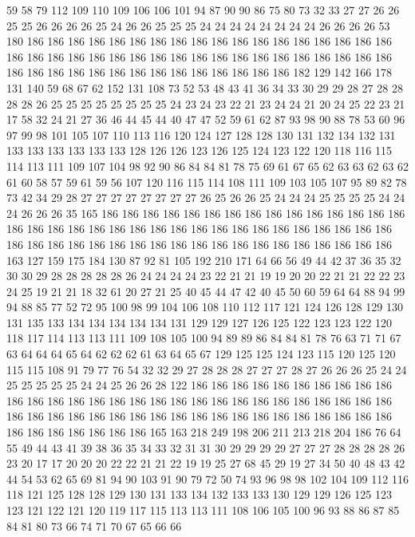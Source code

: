 59 58 79 112 109 110 109 106 106 101 94 87 90 90 86 75 80 73 32 33
27 27 26 26 25 25 26 26 26 26 25 24 26 26 25 25 25 24 24 24
24 24 24 24 24 26 26 26 26 53 180 186 186 186 186 186 186 186 186 186
186 186 186 186 186 186 186 186 186 186 186 186 186 186 186 186 186 186 186 186
186 186 186 186 186 186 186 186 186 186 186 186 186 186 186 186 186 186 186 186
186 186 182 129 142 166 178 131 140 59 68 67 62 152 131 108 73 52 53 48
43 41 36 34 33 30 29 29 28 27 28 28 28 28 26 25 25 25 25 25
25 25 25 24 23 24 23 22 21 23 24 24 21 20 24 25 22 23 21 17
58 32 24 21 27 36 46 44 45 44 40 47 47 52 59 61 62 87 93 98
90 88 78 53 60 96 97 99 98 101 105 107 110 113 116 120 124 127 128 128
130 131 132 134 132 131 133 133 133 133 133 133 128 126 126 123 126 125 124 123
122 120 118 116 115 114 113 111 109 107 104 98 92 90 86 84 84 81 78 75
69 61 67 65 62 63 63 62 63 62 61 60 58 57 59 61 59 56 107 120
116 115 114 108 111 109 103 105 107 95 89 82 78 73 42 34 29 28 27 27
27 27 27 27 27 27 26 25 26 26 25 24 24 24 25 25 25 25 24 24
24 26 26 26 35 165 186 186 186 186 186 186 186 186 186 186 186 186 186 186
186 186 186 186 186 186 186 186 186 186 186 186 186 186 186 186 186 186 186 186
186 186 186 186 186 186 186 186 186 186 186 186 186 186 186 186 186 186 186 163
127 159 175 184 130 87 92 81 105 192 210 171 64 66 56 49 44 42 37 36
35 32 30 30 29 28 28 28 28 28 26 24 24 24 24 23 22 21 21 19
19 20 20 22 21 21 22 22 23 24 25 19 21 21 18 32 61 20 27 21
25 40 45 44 47 42 40 45 50 60 59 64 64 88 94 99 94 88 85 77
52 72 95 100 98 99 104 106 108 110 112 117 121 124 126 128 129 130 131 135
133 134 134 134 134 134 131 129 129 127 126 125 122 123 123 122 120 118 117 114
113 113 111 109 108 105 100 94 89 89 86 84 84 81 78 76 63 71 71 67
63 64 64 64 65 64 62 62 62 61 63 64 65 67 129 125 125 124 123 115
120 125 120 115 115 108 91 79 77 76 54 32 32 29 27 28 28 28 27 27
27 28 27 26 26 26 25 24 24 25 25 25 25 25 24 24 25 26 26 28
122 186 186 186 186 186 186 186 186 186 186 186 186 186 186 186 186 186 186 186
186 186 186 186 186 186 186 186 186 186 186 186 186 186 186 186 186 186 186 186
186 186 186 186 186 186 186 186 186 186 186 186 186 186 186 186 165 163 218 249
198 206 211 213 218 204 186 76 64 55 49 44 43 41 39 38 36 35 34 33
32 31 31 30 29 29 29 29 27 27 27 28 28 28 28 26 23 20 17 17
20 20 20 22 22 21 21 22 19 19 25 27 68 45 29 19 27 34 50 40
48 43 42 44 54 53 62 65 69 81 94 90 103 91 90 79 72 50 74 93
96 98 98 102 104 109 112 116 118 121 125 128 128 129 130 131 133 134 132 133
133 130 129 129 126 125 123 123 121 122 121 120 119 117 115 113 113 111 108 106
105 100 96 93 88 86 87 85 84 81 80 73 66 74 71 70 67 65 66 66
